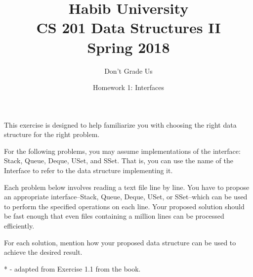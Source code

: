\documentclass[addpoints]{exam}
\title{Habib University\\CS 201 Data Structures II\\Spring 2018}
\author{Don't Grade Us}  %
\date{Homework 1: Interfaces}
\begin{document}
\maketitle

\begin{questions}


This exercise is designed to help familiarize you with choosing the right data structure for the right problem.

For the following problems, you may assume implementations of the interface: Stack, Queue, Deque, USet, and SSet. That is, you can use the name of the Interface to refer to the data structure implementing it.

Each problem below involves reading a text file line by line. You have to propose an appropriate interface--Stack, Queue, Deque, USet, or SSet--which can be used to perform the specified operations on each line. Your proposed solution should be fast enough that even files containing a million lines can be processed efficiently.

For each solution, mention how your proposed data structure can be used to achieve the desired result.

* - adapted from Exercise 1.1 from the book.

\end{questions}
\end{document}

